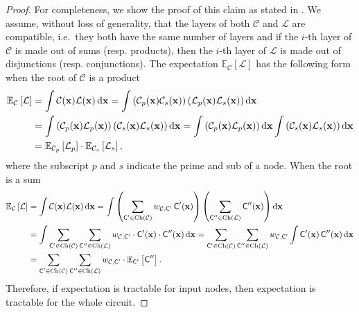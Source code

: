 \expcthm*
\begin{proof}
  For completeness, we show the proof of this claim as stated in \cite{choi20}. We assume, without
  loss of generality, that the layers of both $\mathcal{C}$ and $\mathcal{L}$ are compatible, i.e.\
  they both have the same number of layers and if the $i$-th layer of $\mathcal{C}$ is made out of
  sums (resp. products), then the $i$-th layer of $\mathcal{L}$ is made out of disjunctions (resp.
  conjunctions). The expectation $\mathbb{E}_\mathcal{C}\left[\mathcal{L}\right]$ has the following
  form when the root of $\mathcal{C}$ is a product
  \begin{align*}
    \mathbb{E}_\mathcal{C}\left[\mathcal{L}\right]&=\int\mathcal{C}(\mathbf{x})\mathcal{L}(\mathbf{x})\mathop{}\!\mathrm{d}\mathbf{x}=
    \int\left(\mathcal{C}_p(\mathbf{x})\mathcal{C}_s(\mathbf{x})\right)
    \left(\mathcal{L}_p(\mathbf{x})\mathcal{L}_s(\mathbf{x})\right)\mathop{}\!\mathrm{d}\mathbf{x}\\
    &=\int\left(\mathcal{C}_p(\mathbf{x})\mathcal{L}_p(\mathbf{x})\right)\left(\mathcal{C}_s(\mathbf{x})\mathcal{L}_s(\mathbf{x})\right)\mathop{}\!\mathrm{d}\mathbf{x}
    =\int\left(\mathcal{C}_p(\mathbf{x})\mathcal{L}_p(\mathbf{x})\right)\mathop{}\!\mathrm{d}\mathbf{x}
    \int\left(\mathcal{C}_s(\mathbf{x})\mathcal{L}_s(\mathbf{x})\right)\mathop{}\!\mathrm{d}\mathbf{x}\\
    &=\mathbb{E}_{\mathcal{C}_p}\left[\mathcal{L}_p\right]\cdot\mathbb{E}_{\mathcal{C}_s}\left[\mathcal{L}_s\right],
  \end{align*}
  where the subscript $p$ and $s$ indicate the prime and sub of a node. When the root is a sum
  \begin{align*}
    \mathbb{E}_\mathcal{C}\left[\mathcal{L}\right]&=\int\mathcal{C}(\mathbf{x})\mathcal{L}(\mathbf{x})\mathop{}\!\mathrm{d}\mathbf{x}
    =\int\left(\sum_{\operatorname{\textup{\textsf{C}}}'\in\operatorname*{\normalfont{Ch}}(\mathcal{C})}w_{\mathcal{C},\operatorname{\textup{\textsf{C}}}'}\operatorname{\textup{\textsf{C}}}'(\mathbf{x})\right)
    \left(\sum_{\operatorname{\textup{\textsf{C}}}''\in\operatorname*{\normalfont{Ch}}(\mathcal{L})}\operatorname{\textup{\textsf{C}}}''(\mathbf{x})\right)\mathop{}\!\mathrm{d}\mathbf{x}\\
    &=\int\sum_{\operatorname{\textup{\textsf{C}}}'\in\operatorname*{\normalfont{Ch}}(\mathcal{C})}\sum_{\operatorname{\textup{\textsf{C}}}''\in\operatorname*{\normalfont{Ch}}(\mathcal{L})}w_{\mathcal{C},\operatorname{\textup{\textsf{C}}}'}\cdot\operatorname{\textup{\textsf{C}}}'(\mathbf{x})\cdot\operatorname{\textup{\textsf{C}}}''(\mathbf{x})\mathop{}\!\mathrm{d}\mathbf{x}
    =\sum_{\operatorname{\textup{\textsf{C}}}'\in\operatorname*{\normalfont{Ch}}(\mathcal{C})}\sum_{\operatorname{\textup{\textsf{C}}}''\in\operatorname*{\normalfont{Ch}}(\mathcal{L})}w_{\mathcal{C},\operatorname{\textup{\textsf{C}}}'}\int\operatorname{\textup{\textsf{C}}}'(\mathbf{x})\operatorname{\textup{\textsf{C}}}''(\mathbf{x})\mathop{}\!\mathrm{d}\mathbf{x}\\
    &=\sum_{\operatorname{\textup{\textsf{C}}}'\in\operatorname*{\normalfont{Ch}}(\mathcal{C})}\sum_{\operatorname{\textup{\textsf{C}}}''\in\operatorname*{\normalfont{Ch}}(\mathcal{L})}w_{\mathcal{C},\operatorname{\textup{\textsf{C}}}'}\cdot\mathbb{E}_{\operatorname{\textup{\textsf{C}}}'}\left[\operatorname{\textup{\textsf{C}}}''\right].
  \end{align*}
  Therefore, if expectation is tractable for input nodes, then expectation is tractable for the
  whole circuit.
\end{proof}

